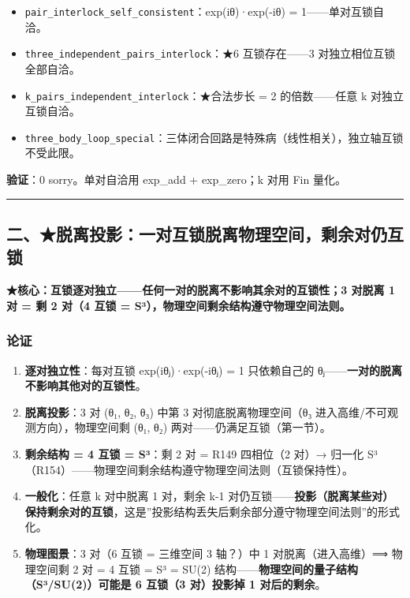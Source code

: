\documentclass[
]{article}
\providecommand{\tightlist}{%
  \setlength{\itemsep}{0pt}\setlength{\parskip}{0pt}}
\begin{document}
\begin{itemize}
\tightlist
\item
  \texttt{pair\_interlock\_self\_consistent}：exp(iθ)·exp(-iθ) =
  1------单对互锁自洽。
\item
  \texttt{three\_independent\_pairs\_interlock}：★6 互锁存在------3
  对独立相位互锁全部自洽。
\item
  \texttt{k\_pairs\_independent\_interlock}：★合法步长 = 2
  的倍数------任意 k 对独立互锁自洽。
\item
  \texttt{three\_body\_loop\_special}：三体闭合回路是特殊病（线性相关），独立轴互锁不受此限。
\end{itemize}

\textbf{验证}：0 sorry。单对自洽用 exp\_add + exp\_zero；k 对用 Fin
量化。

\begin{center}\rule{0.5\linewidth}{0.5pt}\end{center}

\subsection{二、★脱离投影：一对互锁脱离物理空间，剩余对仍互锁}\label{ux4e8cux8131ux79bbux6295ux5f71ux4e00ux5bf9ux4e92ux9501ux8131ux79bbux7269ux7406ux7a7aux95f4ux5269ux4f59ux5bf9ux4ecdux4e92ux9501}

\textbf{★核心：互锁逐对独立------任何一对的脱离不影响其余对的互锁性；3
对脱离 1 对 = 剩 2 对（4 互锁 =
S³），物理空间剩余结构遵守物理空间法则。}

\subsubsection{论证}\label{ux8bbaux8bc1-1}

\begin{enumerate}
\def\labelenumi{\arabic{enumi}.}
\tightlist
\item
  \textbf{逐对独立性}：每对互锁 exp(iθⱼ)·exp(-iθⱼ) = 1 只依赖自己的
  θⱼ------\textbf{一对的脱离不影响其他对的互锁性}。
\item
  \textbf{脱离投影}：3 对 (θ₁, θ₂, θ₃) 中第 3 对彻底脱离物理空间（θ₃
  进入高维/不可观测方向），物理空间剩 (θ₁, θ₂)
  两对------仍满足互锁（第一节）。
\item
  \textbf{剩余结构 = 4 互锁 = S³}：剩 2 对 = R149 四相位（2 对）→ 归一化
  S³（R154）------物理空间剩余结构遵守物理空间法则（互锁保持性）。
\item
  \textbf{一般化}：任意 k 对中脱离 1 对，剩余 k-1
  对仍互锁------\textbf{投影（脱离某些对）保持剩余对的互锁}，这是''投影结构丢失后剩余部分遵守物理空间法则''的形式化。
\item
  \textbf{物理图景}：3 对（6 互锁 = 三维空间 3 轴？）中 1
  对脱离（进入高维）⟹ 物理空间剩 2 对 = 4 互锁 = S³ = SU(2)
  结构------\textbf{物理空间的量子结构（S³/SU(2)）可能是 6 互锁（3
  对）投影掉 1 对后的剩余}。
\end{enumerate}
\end{document}
